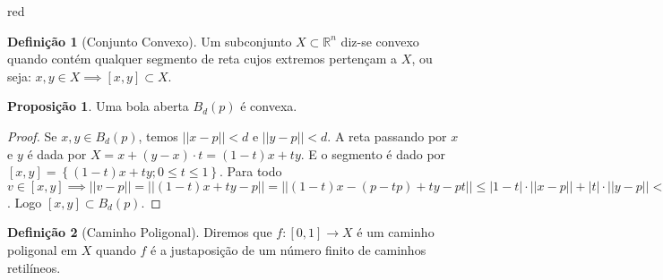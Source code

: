 \documentclass[12pt,leqno,twoside]{amsart}
\theoremstyle{definition}
\newtheorem{proposicao}{Proposição}[section]
\newtheorem{definicao}{Definição}[section]
\begin{document}
\begin{color}{red}
\begin{definicao}[Conjunto Convexo]
	Um subconjunto $X\subset\mathbb{R}^n$ diz-se convexo quando contém qualquer segmento de reta cujos extremos pertençam a $X$, ou seja: $x, y \in X \implies [x, y] \subset X$.
\end{definicao}

\vspace{0.3cm}

\begin{proposicao}
	Uma bola aberta $B_{d}(p)$ é convexa.
\end{proposicao}
\begin{proof}
	Se $x,y\in B_{d}(p)$, temos $|| x-p||<d$ e $|| y-p|| < d$. A reta passando por $x$ e $y$ é dada por $X = x+(y-x)\cdot t = (1-t)x +t y$. E o segmento é dado por $ [x,y] = \left\{ (1-t)x +ty; 0 \leq t \leq 1\right\}$. Para todo $v\in [x,y] \implies || v-p || = || (1-t)x +ty -p|| = || (1-t)x -(p-tp) +ty-pt|| \leq |1-t|\cdot || x-p|| + |t| \cdot || y-p|| < \left( 1+t -t \right) \cdot d = d$. Logo $[x,y] \subset B_{d}(p)$.
\end{proof}

\vspace{0.3cm}

\begin{definicao}[Caminho Poligonal]
	Diremos que $f : [0, 1] \to X$ é um caminho poligonal em $X$ quando $f$ é a justaposição de um número  finito de caminhos retilíneos.
\end{definicao}

\vspace{0.3cm}


\end{color}
\end{document}
